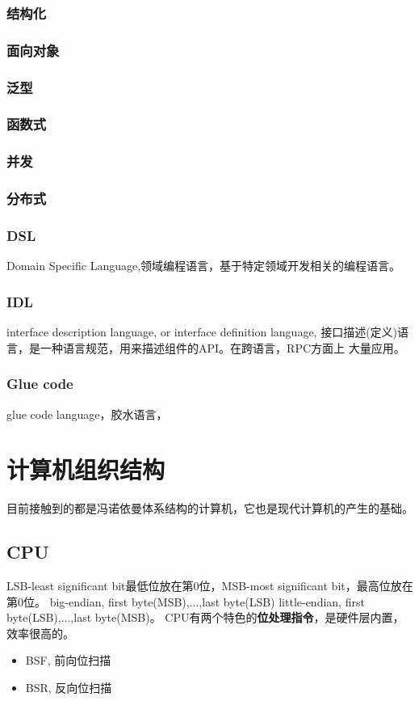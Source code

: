 \subsubsection{结构化}

\subsubsection{面向对象}

\subsubsection{泛型}

\subsubsection{函数式}

\subsubsection{并发}

\subsubsection{分布式}

\subsubsection{DSL}
Domain Specific Language,领域编程语言，基于特定领域开发相关的编程语言。

\subsubsection{IDL}
interface description language, or interface definition language,
接口描述(定义)语言，是一种语言规范，用来描述组件的API。在跨语言，RPC方面上
大量应用。

\subsubsection{Glue code}
glue code language，胶水语言，

\section{计算机组织结构}
目前接触到的都是冯诺依曼体系结构的计算机，它也是现代计算机的产生的基础。
\subsection{CPU}
LSB-least significant bit最低位放在第0位，MSB-most significant bit，最高位放在第0位。
\newline
big-endian, first byte(MSB),...,last byte(LSB)
\newline
little-endian, first byte(LSB),...,last byte(MSB)。
\newline
CPU有两个特色的\textbf{位处理指令}，是硬件层内置，效率很高的。
\begin{itemize}
    \item {BSF, 前向位扫描}
    \item {BSR, 反向位扫描}
\end{itemize}

